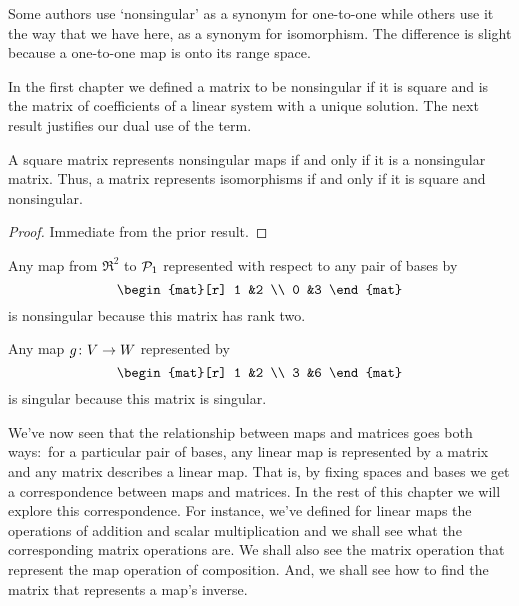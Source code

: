 \begin{remark}
Some authors use `nonsingular' as a synonym for one-to-one  
while others use it the way that we have here, as a synonym for
isomorphism.
The difference is slight because a one-to-one map is onto its
range space.
\end{remark}

In the first chapter we defined a matrix to be nonsingular 
if it is square and is
the matrix of coefficients of a linear system with a unique solution.
The next result justifies our dual use of the term.

\begin{corollary} \label{cor:NonsingMatIffNonsingMap}
A square matrix represents nonsingular maps if and only if it is a nonsingular
matrix.
Thus, a matrix represents isomorphisms if and only if it is square and
nonsingular. 
\end{corollary}

\begin{proof}
Immediate from the prior result.
\end{proof}

\begin{example}
Any map from \( \Re^2 \) to \( \mathcal{P}_1 \) represented 
with respect to any pair of bases by
\begin{equation*}
  \begin{mat}[r]
     1  &2  \\
     0  &3  
  \end{mat}
\end{equation*}
is nonsingular because this matrix has rank two.
\end{example}

\begin{example} \label{ex:NonSMatHasNonSMap}
Any map \( \mbox{$g\colon V\to W$} \) represented by
\begin{equation*}
  \begin{mat}[r]
    1  &2  \\
    3  &6
  \end{mat}
\end{equation*}
is singular because this matrix is singular.
\end{example}

We've now seen that the relationship between maps and 
matrices goes both ways:~for a particular pair of bases, 
any linear map is represented by a
matrix and any matrix describes a linear map.
That is, by fixing spaces and bases we get
a correspondence between maps and matrices.
In the rest of this chapter we will explore this correspondence.
For instance, we've defined for linear maps the operations of addition 
and scalar multiplication and we shall see what the corresponding matrix 
operations are.
We shall also see the matrix operation that represent the map operation
of composition.
And, we shall see how to find the matrix that represents a map's inverse.



